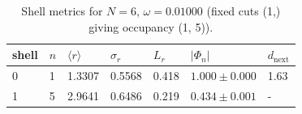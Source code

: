 \begin{table}[t]
\centering
\small
\setlength{\tabcolsep}{4pt}
\renewcommand{\arraystretch}{1.15}
\begin{tabular}{lllllll}
\toprule
\textbf{shell} & $n$ & $\langle r\rangle$ & $\sigma_r$ & $L_r$ & $|\Phi_n|$ & $d_{\mathrm{next}}$ \\
\midrule
0 & 1 & 1.3307 & 0.5568 & 0.418 & $1.000\pm 0.000$ & 1.63 \\
1 & 5 & 2.9641 & 0.6486 & 0.219 & $0.434\pm 0.001$ & - \\
\bottomrule
\end{tabular}
\caption{Shell metrics for $N=6$, $\omega=0.01000$ (fixed cuts (1,) giving occupancy (1, 5)).}
\label{tab:shells_N6_omega0p01000}
\end{table}